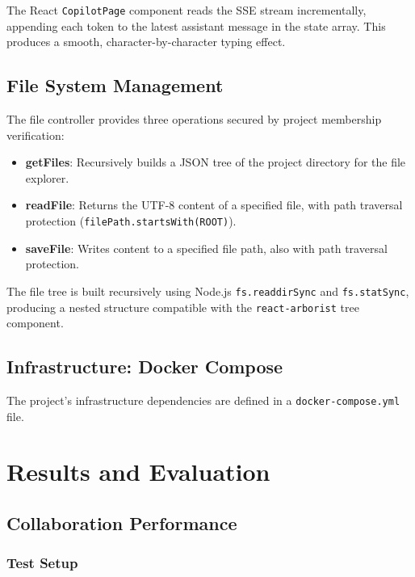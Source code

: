 \documentclass[12pt,a4paper,oneside]{report}
\begin{document}
The React \texttt{CopilotPage} component reads the SSE stream incrementally, appending each token to the latest assistant message in the state array. This produces a smooth, character-by-character typing effect.

\section{File System Management}

The file controller provides three operations secured by project membership verification:

\begin{itemize}
    \item \textbf{getFiles}: Recursively builds a JSON tree of the project directory for the file explorer.
    \item \textbf{readFile}: Returns the UTF-8 content of a specified file, with path traversal protection (\texttt{filePath.startsWith(ROOT)}).
    \item \textbf{saveFile}: Writes content to a specified file path, also with path traversal protection.
\end{itemize}

The file tree is built recursively using Node.js \texttt{fs.readdirSync} and \texttt{fs.statSync}, producing a nested structure compatible with the \texttt{react-arborist} tree component.

\section{Infrastructure: Docker Compose}

The project's infrastructure dependencies are defined in a \texttt{docker-compose.yml} file.


\chapter{Results and Evaluation}

\section{Collaboration Performance}

\subsection{Test Setup}
\end{document}
